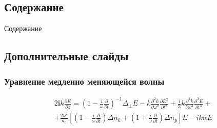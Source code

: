 \documentclass[fullscreen=true,unicode,bookmarks=true,colorlinks,urlcolor=blue,unicode]{beamer}
\begin{document}
	\subsection{Содержание}
	
	\begin{frame}{Содержание}
		\vspace{1.0em}
		{\scriptsize \tableofcontents}
	\end{frame}

	\subsection{Дополнительные слайды}

	\begin{frame}
		\frametitle{Уравнение медленно меняющейся волны}
		
		\begin{eqnarray}
			2\textbf{i}k\frac{\partial E}{\partial z} =
			\left( 1-\frac{i}{\omega}\frac{\partial}{\partial t}\right)^{-1}\Delta_{\perp}E -
			k\frac{\partial^2 k}{\partial \omega^2}\frac{\partial E^2}{\partial t^2} +
			\frac{i}{3}k\frac{\partial^3 k}{\partial \omega^3}\frac{\partial^3 E}{\partial t^3} +  \nonumber \\
			+ \frac{2k^2}{n_0}\left[
				\left( 1-\frac{i}{\omega}\frac{\partial}{\partial t}\right)\Delta n_k +
				\left( 1+\frac{i}{\omega}\frac{\partial}{\partial t}\right)\Delta n_p
			\right] E  - i k \alpha E  \nonumber
		\end{eqnarray}
	\end{frame}
\end{document}
